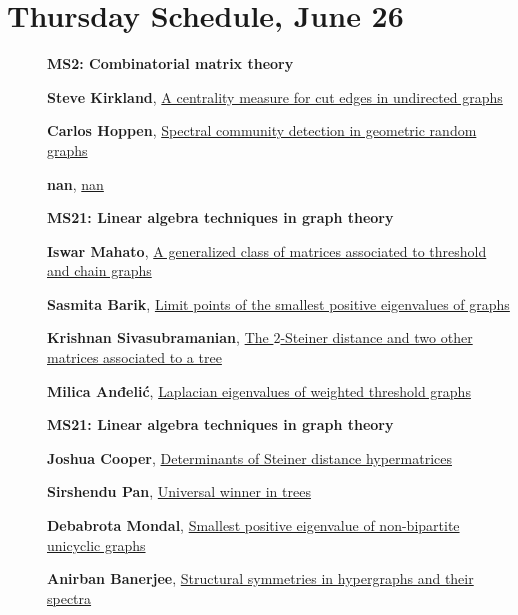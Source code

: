 \documentclass[ILAS2025-program.tex]{subfiles}
\begin{document}
\section*{Thursday Schedule, June 26 }
        
        \begin{description}
    \item[] {\color{mstitle}\textbf{MS2: Combinatorial matrix theory}} 
    \item[] \hypertarget{up0295}{}\textbf{Steve Kirkland}, \hyperlink{down0295}{A centrality measure for cut edges in undirected graphs
}
        \item[] \hypertarget{up0296}{}\textbf{Carlos Hoppen}, \hyperlink{down0296}{Spectral community detection in geometric random graphs}
        \item[] \hypertarget{up0297}{}\textbf{nan}, \hyperlink{down0297}{nan}
        \end{description}
    \begin{description}
    \item[] {\color{mstitle}\textbf{MS21: Linear algebra techniques in graph theory}} 
    \item[] \hypertarget{up0335}{}\textbf{Iswar Mahato}, \hyperlink{down0335}{A generalized class of matrices associated to threshold and chain graphs}
        \item[] \hypertarget{up0336}{}\textbf{Sasmita Barik}, \hyperlink{down0336}{Limit points of the smallest positive eigenvalues of graphs
}
        \item[] \hypertarget{up0337}{}\textbf{Krishnan Sivasubramanian}, \hyperlink{down0337}{The $2$-Steiner distance and two other matrices associated to a tree}
        \item[] \hypertarget{up0338}{}\textbf{Milica Anđelić}, \hyperlink{down0338}{Laplacian eigenvalues of weighted threshold graphs}
        \end{description}
    \begin{description}
    \item[] {\color{mstitle}\textbf{MS21: Linear algebra techniques in graph theory}} 
    \item[] \hypertarget{up0379}{}\textbf{Joshua Cooper}, \hyperlink{down0379}{Determinants of Steiner distance hypermatrices}
        \item[] \hypertarget{up0380}{}\textbf{Sirshendu Pan}, \hyperlink{down0380}{Universal winner in trees}
        \item[] \hypertarget{up0381}{}\textbf{Debabrota Mondal}, \hyperlink{down0381}{Smallest positive eigenvalue of non-bipartite unicyclic graphs}
        \item[] \hypertarget{up0382}{}\textbf{Anirban Banerjee}, \hyperlink{down0382}{Structural symmetries in hypergraphs and their spectra}
        \end{description}
    \newpage
\end{document}
